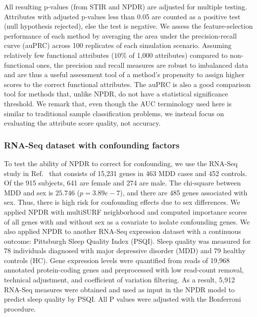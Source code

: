\documentclass[10pt]{article}
\begin{document}
All resulting p-values (from STIR and NPDR) are adjusted for multiple testing.
Attributes with adjusted p-values less than 0.05 are counted as a positive test (null hypothesis rejected), else the test is negative.
We assess the feature-selection performance of each method by averaging the area under the precision-recall curve (auPRC) across 100 replicates of each simulation scenario.
Assuming relatively few functional attributes ($10\%$ of 1,000 attributes) compared to non-functional ones, the precision and recall measures are robust to imbalanced data and are thus a useful assessment tool of a method's propensity to assign higher scores to the correct functional attributes. The auPRC is also a good comparison tool for methods that, unlike NPDR, do not have a statistical significance threshold. We remark that, even though the AUC terminology used here is similar to traditional sample classification problems, we instead focus on evaluating the attribute score quality, not accuracy.

\subsubsection{RNA-Seq dataset with confounding factors}
To test the ability of NPDR to correct for confounding, we use the RNA-Seq study in Ref.~\cite{mostafavi14} that consists of 15,231 genes in 463 MDD cases and 452 controls.
Of the 915 subjects, 641 are female and 274 are male.
The chi-square between MDD and sex is $25.746$ ($p=3.89e-7$), and there are 485 genes associated with sex.
Thus, there is high risk for confounding effects due to sex differences. We applied NPDR with multiSURF neighborhood and computed importance scores of all genes with and without sex as a covariate to isolate confounding genes. 
We also applied NPDR to another RNA-Seq expression dataset with a continuous outcome: Pittsburgh Sleep Quality Index (PSQI). Sleep quality was measured for 78 individuals diagnosed with major depressive disorder (MDD) and 79 healthy controls (HC)\cite{le18}.
Gene expression levels were quantified from reads of 19,968 annotated protein-coding genes and preprocessed with low read-count removal, technical adjustment, and coefficient of variation filtering.
As a result, 5,912 RNA-Seq measures were obtained and used as input in the NPDR model to predict sleep quality by PSQI\cite{psqi}.
All P values were adjusted with the Bonferroni procedure.
\end{document}

